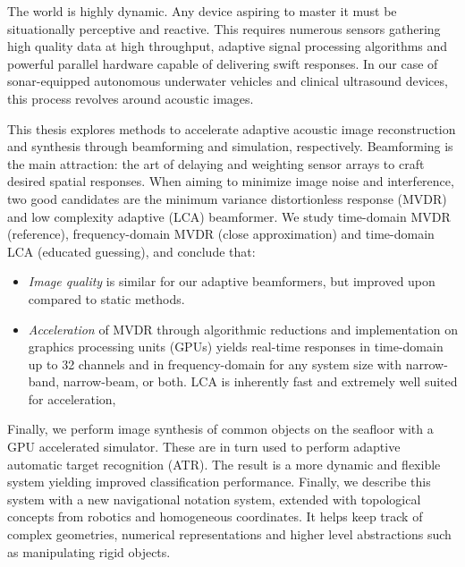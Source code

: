 
The world is highly dynamic. Any device aspiring to master it must be situationally perceptive and reactive. This requires numerous sensors gathering high quality data at high throughput, adaptive signal processing algorithms and powerful parallel hardware capable of delivering swift responses. In our case of sonar-equipped autonomous underwater vehicles and clinical ultrasound devices, this process revolves around acoustic images.

This thesis explores methods to accelerate adaptive acoustic image reconstruction and synthesis through beamforming and simulation, respectively. Beamforming is the main attraction: the art of delaying and weighting sensor arrays to craft desired spatial responses. When aiming to minimize image noise and interference, two good candidates are the minimum variance distortionless response (MVDR) and low complexity adaptive (LCA) beamformer. We study time-domain MVDR (reference), frequency-domain MVDR (close approximation) and time-domain LCA (educated guessing), and conclude that:
%
\begin{itemize}
\item \emph{Image quality} is similar for our adaptive beamformers, but improved upon compared to static methods.
%
%
\item \emph{Acceleration} of MVDR through algorithmic reductions and implementation on graphics processing units (GPUs) yields real-time responses in time-domain up to 32 channels and in frequency-domain for any system size with narrow-band, narrow-beam, or both. LCA is inherently fast and extremely well suited for acceleration, 
\end{itemize}
%
Finally, we perform image synthesis of common objects on the seafloor with a GPU accelerated simulator. These are in turn used to perform adaptive automatic target recognition (ATR). The result is a more dynamic and flexible system yielding improved classification performance. Finally, we describe this system with a new navigational notation system, extended with topological concepts from robotics and homogeneous coordinates. It helps keep track of complex geometries, numerical representations and higher level abstractions such as manipulating rigid objects.



